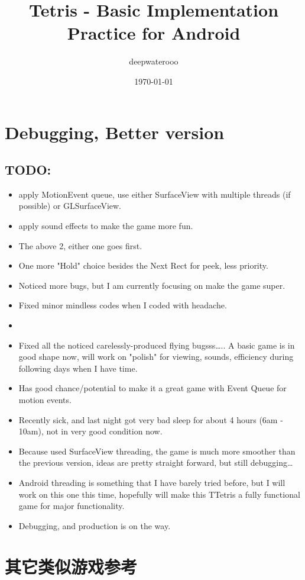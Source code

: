 \documentclass[9pt,b5paper]{article}
\author{deepwaterooo}
\date{\today}
\title{Tetris - Basic Implementation Practice for Android}
\begin{document}
\maketitle
\tableofcontents


\section{Debugging, Better version}
\label{sec-1}
\subsection{TODO:}
\label{sec-1-1}
\begin{itemize}
\item apply MotionEvent queue, use either SurfaceView with multiple threads (if possible) or GLSurfaceView.
\item apply sound effects to make the game more fun.
\item The above 2, either one goes first.
\item One more "Hold" choice besides the Next Rect for peek, less priority.
\item Noticed more bugs, but I am currently focusing on make the game super.
\item Fixed minor mindless codes when I coded with headache.
\item 
\item Fixed all the noticed carelessly-produced flying bugsss\ldots{}.. A basic game is in good shape now, will work on "polish" for viewing, sounds, efficiency during following days when I have time.
\item Has good chance/potential to make it a great game with Event Queue for motion events.
\item Recently sick, and last night got very bad sleep for about 4 hours (6am - 10am), not in very good condition now.
\item Because used SurfaceView threading, the game is much more smoother than the previous version, ideas are pretty straight forward, but still debugging\ldots{}
\item Android threading is something that I have barely tried before, but I will work on this one this time, hopefully will make this TTetris a fully functional game for major functionality.
\item Debugging, and production is on the way.
\end{itemize}

\section{其它类似游戏参考}
\label{sec-2}
\end{document}
